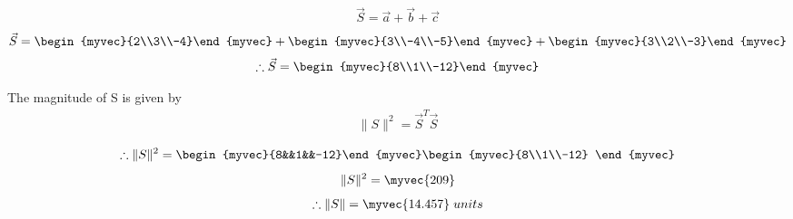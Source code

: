 \documentclass[journal]{IEEEtran}
\begin{document}
\begin{align}
    \vec{S}=\vec{a}+\vec{b}+\vec{c}
\end{align}
\begin{align}
    \vec{S}=\begin{myvec}{2\\3\\-4}\end{myvec}+\begin{myvec}{3\\-4\\-5}\end{myvec}+\begin{myvec}{3\\2\\-3}\end{myvec}
\end{align}
\begin{align}
    \therefore\vec{S}=\begin{myvec}{8\\1\\-12}\end{myvec}
\end{align}

The magnitude of S is given by \\
\begin{align}
    \|S\|^2=\vec{S}^T\vec{S}
\end{align}

\begin{align}
      \therefore\|S\|^2=\begin{myvec}{8&&1&&-12}\end{myvec}\begin{myvec}{8\\1\\-12}
      \end{myvec}
\end{align}
\begin{align}
    \|S\|^2=\myvec{209}
\end{align}
\begin{align}
    \therefore\|S\|=\myvec{14.457} \;units
\end{align}
\newpage
\vspace*{0.25cm}
\end{document}
